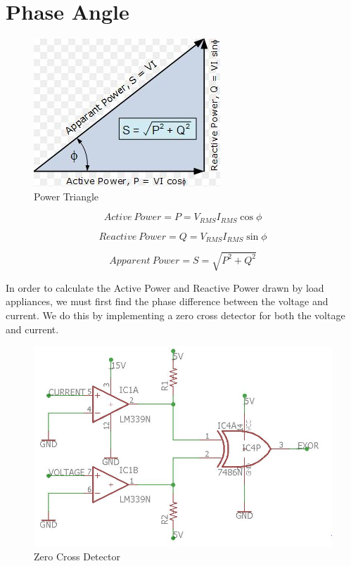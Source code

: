 \section{Phase Angle}
{

\begin{figure}[H]
	    \includegraphics[scale=1]{images/triangle.jpg}
	    \centering
	    \caption{Power Triangle}
	    \label{cdiff}
	\end{figure}

\begin{equation}
    Active\ Power = P = V_{RMS}I_{RMS}\cos\phi
\end{equation}


\begin{equation}
    Reactive\ Power = Q = V_{RMS}I_{RMS}\sin\phi
\end{equation}

\begin{equation}
    Apparent\ Power = S = \sqrt{P^{2}+Q^{2}}
\end{equation}

In order to calculate the Active Power and Reactive Power drawn by load appliances, we must first find the phase difference between the voltage and current.
We do this by implementing a zero cross detector for both the voltage and current. 


\begin{figure}[H]
	    \includegraphics[scale=0.75]{images/zcd.jpg}
	    \centering
	    \caption{Zero Cross Detector}
	    \label{zcd}
	\end{figure}


}
